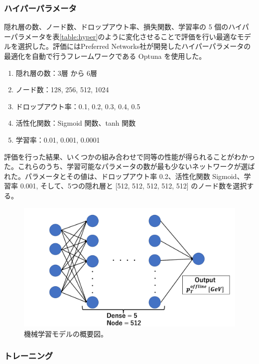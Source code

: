 \subsubsection{ハイパーパラメータ}
隠れ層の数、ノード数、ドロップアウト率、損失関数、学習率の 5 個のハイパーパラメータを表\ref{table:hyper}のように変化させることで評価を行い最適なモデルを選択した。評価にはPreferred Networks社が開発したハイパーパラメータの最適化を自動で行うフレームワークである Optuna \cite{article:optuna}を使用した。
\begin{enumerate}\label{table:hyper}
   \item 隠れ層の数：3層 から 6層
   \item ノード数：128, 256, 512, 1024
   \item ドロップアウト率：0.1, 0.2, 0.3, 0.4, 0.5
   \item 活性化関数：Sigmoid 関数、tanh 関数
   \item 学習率：0.01, 0.001, 0.0001
\end{enumerate}
評価を行った結果、いくつかの組み合わせで同等の性能が得られることがわかった。これらのうち、学習可能なパラメータの数が最も少ないネットワークが選ばれた。パラメータとその値は、ドロップアウト率 0.2、活性化関数 Sigmoid、学習率 0.001, そして、5つの隠れ層と [512, 512, 512, 512, 512] のノード数を選択する。

\begin{figure}[tb]
  \centering
  \includegraphics[clip, width=12cm]{fig/4/MLP.pdf}
  \caption{機械学習モデルの概要図。}
  \label{fig:MLP_overview}
\end{figure}


\subsubsection{トレーニング}




